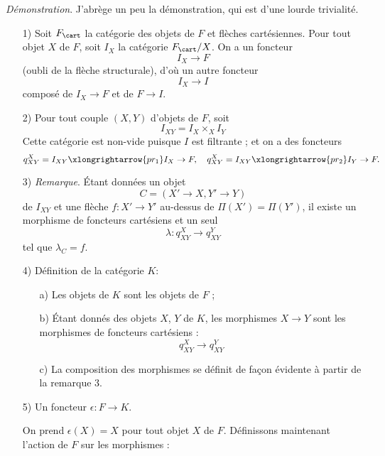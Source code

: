 {\it Démonstration}. J'abrège un peu la démonstration, qui est d'une lourde trivialité. 
\begin{enumerate}
    \item[1)] Soit $F_{\cart}$ la catégorie des objets de $F$ et flèches cartésiennes. Pour tout objet $X$ de $F$, soit $I_X$ la catégorie $F_{\cart}/X$. On a un foncteur
    $$
    I_X \to F
    $$
    (oubli de la flèche structurale), d'où un autre foncteur
    $$
    I_X \to I
    $$
    composé de $I_X \to F$ et de $F \to I$.
    \item[2)] Pour tout couple $(X, Y)$ d'objets de $F$, soit
    $$
    I_{XY} = I_{X} \times_X I_Y
    $$
    Cette catégorie est non-vide puisque $I$ est filtrante ; et on a des foncteurs 
    $$
    q^X_{XY} = I_{XY} \xlongrightarrow{pr_1} I_X \to F, \quad q^X_{XY} = I_{XY} \xlongrightarrow{pr_2} I_Y \to F.
    $$
    \item[3)] \emph{Remarque}. Étant données un objet
    $$
    C = (X' \to X, Y' \to Y)
    $$
    de $I_{XY}$ et une flèche $f: X' \to Y'$ au-dessus de $\Pi(X') = \Pi(Y')$, il existe un morphisme de foncteurs cartésiens et un seul
    $$
    \lambda: q^X_{XY} \to q^Y_{XY}
    $$
    tel que $\lambda_C = f$.
    \item[4)] Définition de la catégorie $K$:
    \begin{enumerate}
        \item[a)] Les objets de $K$ sont les objets de $F$ ;
        \item[b)] Étant donnés des objets $X$, $Y$ de $K$, les morphismes $X \to Y$ sont les morphismes de foncteurs cartésiens :
        $$
        q^X_{XY} \to q^Y_{XY}
        $$
        \item[c)] La composition des morphismes se définit de fa\c{c}on évidente à partir de la remarque 3.
    \end{enumerate}
    \item[5)] Un foncteur $\epsilon: F \to K$. 
    
    On prend $\epsilon(X) = X$ pour tout objet $X$ de $F$. Définissons maintenant l'action de $F$ sur les morphismes :
    

\end{enumerate}
